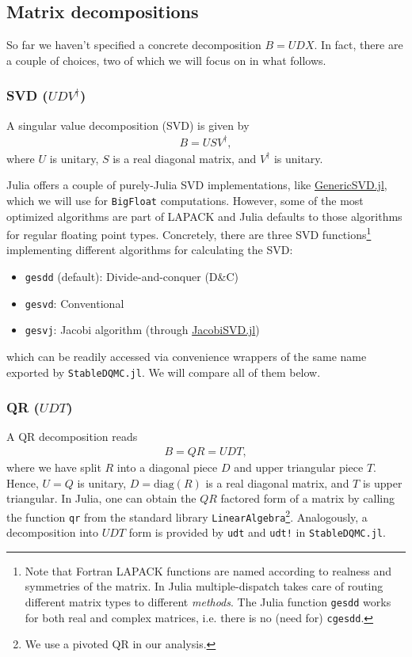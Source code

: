 \documentclass[submission, Phys]{SciPost}
\begin{document}
\subsection{Matrix decompositions}

So far we haven't specified a concrete decomposition ${B = UDX}$. In fact, there are a couple of choices, two of which we will focus on in what follows.

\subsubsection{SVD ($UDV^\dagger$)}
A singular value decomposition (SVD) is given by
\begin{align}
	B = USV^\dagger,
\end{align}
where $U$ is unitary, $S$ is a real diagonal matrix, and $V^\dagger$ is unitary.

Julia offers a couple of purely-Julia SVD implementations, like \href{https://github.com/JuliaLinearAlgebra/GenericSVD.jl/}{GenericSVD.jl}, which we will use for \texttt{BigFloat} computations. However, some of the most optimized algorithms are part of LAPACK \cite{LAPACK} and Julia defaults to those algorithms for regular floating point types. Concretely, there are three SVD functions\footnote{Note that Fortran LAPACK functions are named according to realness and symmetries of the matrix. In Julia multiple-dispatch takes care of routing different matrix types to different \textit{methods}. The Julia function \texttt{gesdd} works for both real and complex matrices, i.e. there is no (need for) \texttt{cgesdd}.} implementing different algorithms for calculating the SVD:
\begin{itemize}
	\item \texttt{gesdd} (default): Divide-and-conquer (D\&C)
	\item \texttt{gesvd}: Conventional
	\item \texttt{gesvj}: Jacobi algorithm (through \href{https://github.com/RalphAS/JacobiSVD.jl}{JacobiSVD.jl})
\end{itemize}
which can be readily accessed via convenience wrappers of the same name exported by \texttt{StableDQMC.jl}. We will compare all of them below.

\subsubsection{QR ($UDT$)}
A QR decomposition reads
\begin{align}
	B = QR = UDT,
\end{align}
where we have split $R$ into a diagonal piece $D$ and upper triangular piece $T$. Hence, $U = Q$ is unitary, $D = \textrm{diag}(R)$ is a real diagonal matrix, and $T$ is upper triangular. In Julia, one can obtain the $QR$ factored form of a matrix by calling the function \texttt{qr} from the standard library \texttt{LinearAlgebra}\footnote{We use a pivoted QR in our analysis.}. Analogously, a decomposition into $UDT$ form is provided by \texttt{udt} and \texttt{udt!} in \texttt{StableDQMC.jl}.
\end{document}
